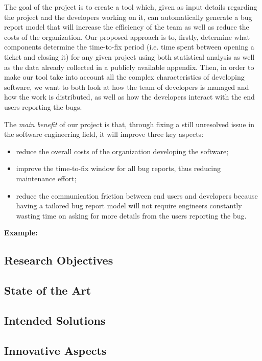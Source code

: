 \documentclass[11pt,english,twocolumn]{article}
\begin{document}
The goal of the project is to create a tool which, given as input details
regarding the project and the developers working on it, can automatically
generate a bug report model that will increase the efficiency of the team
as well as reduce the costs of the organization. Our proposed approach is to,
firstly, determine what components determine the time-to-fix period (i.e. time spent
between opening a ticket and closing it) for any given project using both
statistical analysis as well as the data already collected in a publicly 
available appendix\cite{breu2009appendix}. 
Then, in order to make our tool take into account all the complex characteristics
of developing software, we want to both look at how the team of developers is 
managed and how the work is distributed, as well as how the developers interact
with the end users reporting the bugs.

The \emph{main benefit} of our project is that, through fixing a still
unresolved issue in the software engineering field, it will improve three 
key aspects:

\begin{itemize}
	\item reduce the overall costs of the organization developing the software;
	\item improve the time-to-fix window for all bug reports, thus reducing
	maintenance effort;
	\item reduce the communication friction between end users and developers
	because having a tailored bug report model will not require engineers
	constantly wasting time on asking for more details from the users reporting
	the bug.
\end{itemize}

\textbf{Example:} 

\subsection*{Research Objectives}

\subsection*{State of the Art}

\subsection*{Intended Solutions}

\subsection*{Innovative Aspects}
\end{document}
